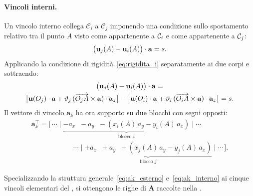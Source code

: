 \paragraph{Vincoli interni.}
Un vincolo interno collega $\mathcal{C}_i$ a $\mathcal{C}_j$
imponendo una condizione sullo spostamento relativo tra il punto $A$ visto come appartenente a $\mathcal{C}_i$ e come appartenente
a $\mathcal{C}_j$:
\begin{equation}\label{eq:vincolo_int_vett}
\big(\mathbf{u}_j(A) - \mathbf{u}_i(A)\big) \cdot \mathbf{a} = s.
\end{equation}
Applicando la condizione di rigidità~\eqref{eq:rigidita_i}
separatamente ai due corpi e sottraendo:
\begin{multline}\label{eq:vincolo_int_scal}
\big(\mathbf{u}_j(A) - \mathbf{u}_i(A)\big)\cdot\mathbf{a}
	= \\
	\bigl[\mathbf{u}(O_j)\cdot\mathbf{a}
	+ \vartheta_j\,(\overrightarrow{O_j A}\times\mathbf{a})
	\cdot\mathbf{a}_z\bigr]
	- \bigl[\mathbf{u}(O_i)\cdot\mathbf{a}
	+ \vartheta_i\,(\overrightarrow{O_i A}\times\mathbf{a})
	\cdot\mathbf{a}_z\bigr]
	= s.
\end{multline}
Il vettore di vincolo $\bm{a}_k$ ha ora supporto su due
blocchi con segni opposti:
\begin{multline}\label{eq:ak_interno}
	\bm{a}_k^{\top} =
	\bigl[\,\cdots\;\Big|\;
	\underbrace{-a_x \;\; -a_y \;\;
		-(x_i(A)\,a_y - y_i(A)\,a_x)
	}_{\text{blocco }i}
	\;\Big|\;\cdots \\[6pt]
	\hspace{6em}
	\cdots\;\Big|\;
	\underbrace{+a_x \;\; +a_y \;\;
		+(x_j(A)\,a_y - y_j(A)\,a_x)
	}_{\text{blocco }j}
	\;\Big|\;\cdots\,\bigr].
\end{multline}

\medskip
Specializzando la struttura
generale~\eqref{eq:ak_esterno}
e~\eqref{eq:ak_interno} ai cinque vincoli elementari
del , si ottengono le righe di
$\bm{A}$ raccolte nella .

